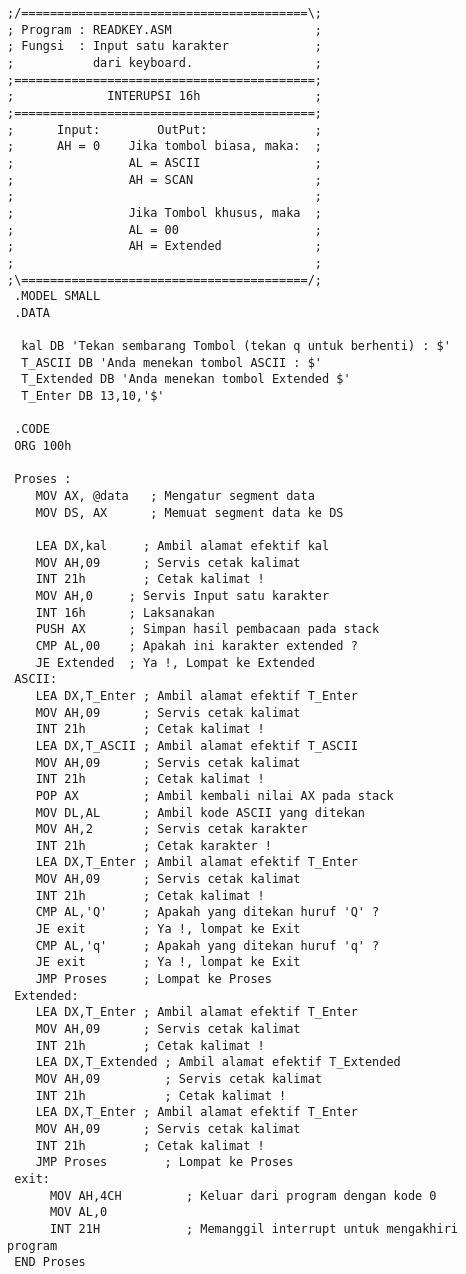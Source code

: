 \documentclass[../main.tex]{subfiles}
\begin{document}
\begin{lstlisting}[language={[x86masm]Assembler}, caption=Program Lengkap - Keyboard Input Demo, label={lst:int16h-00h}]
;/========================================\; 
; Program : READKEY.ASM                    ; 
; Fungsi  : Input satu karakter            ; 
;           dari keyboard.                 ; 
;==========================================; 
;             INTERUPSI 16h                ; 
;==========================================; 
;      Input:        OutPut:               ; 
;      AH = 0    Jika tombol biasa, maka:  ; 
;                AL = ASCII                ; 
;                AH = SCAN                 ; 
;                                          ; 
;                Jika Tombol khusus, maka  ; 
;                AL = 00                   ; 
;                AH = Extended             ; 
;                                          ; 
;\========================================/; 
 .MODEL SMALL 
 .DATA
 
  kal DB 'Tekan sembarang Tombol (tekan q untuk berhenti) : $'
  T_ASCII DB 'Anda menekan tombol ASCII : $' 
  T_Extended DB 'Anda menekan tombol Extended $' 
  T_Enter DB 13,10,'$'
  
 .CODE 
 ORG 100h 
 
 Proses : 
    MOV AX, @data   ; Mengatur segment data
    MOV DS, AX      ; Memuat segment data ke DS
    
    LEA DX,kal     ; Ambil alamat efektif kal 
    MOV AH,09      ; Servis cetak kalimat 
    INT 21h        ; Cetak kalimat !
    MOV AH,0     ; Servis Input satu karakter 
    INT 16h      ; Laksanakan 
    PUSH AX      ; Simpan hasil pembacaan pada stack 
    CMP AL,00    ; Apakah ini karakter extended ? 
    JE Extended  ; Ya !, Lompat ke Extended 
 ASCII: 
    LEA DX,T_Enter ; Ambil alamat efektif T_Enter 
    MOV AH,09      ; Servis cetak kalimat 
    INT 21h        ; Cetak kalimat !
    LEA DX,T_ASCII ; Ambil alamat efektif T_ASCII 
    MOV AH,09      ; Servis cetak kalimat 
    INT 21h        ; Cetak kalimat ! 
    POP AX         ; Ambil kembali nilai AX pada stack 
    MOV DL,AL      ; Ambil kode ASCII yang ditekan 
    MOV AH,2       ; Servis cetak karakter 
    INT 21h        ; Cetak karakter !
    LEA DX,T_Enter ; Ambil alamat efektif T_Enter 
    MOV AH,09      ; Servis cetak kalimat 
    INT 21h        ; Cetak kalimat !
    CMP AL,'Q'     ; Apakah yang ditekan huruf 'Q' ? 
    JE exit        ; Ya !, lompat ke Exit 
    CMP AL,'q'     ; Apakah yang ditekan huruf 'q' ? 
    JE exit        ; Ya !, lompat ke Exit 
    JMP Proses     ; Lompat ke Proses 
 Extended: 
    LEA DX,T_Enter ; Ambil alamat efektif T_Enter 
    MOV AH,09      ; Servis cetak kalimat 
    INT 21h        ; Cetak kalimat !
    LEA DX,T_Extended ; Ambil alamat efektif T_Extended 
    MOV AH,09         ; Servis cetak kalimat 
    INT 21h           ; Cetak kalimat !
    LEA DX,T_Enter ; Ambil alamat efektif T_Enter 
    MOV AH,09      ; Servis cetak kalimat 
    INT 21h        ; Cetak kalimat !
    JMP Proses        ; Lompat ke Proses 
 exit: 
      MOV AH,4CH         ; Keluar dari program dengan kode 0
      MOV AL,0
      INT 21H            ; Memanggil interrupt untuk mengakhiri program
 END Proses
\end{lstlisting}
\end{document}
